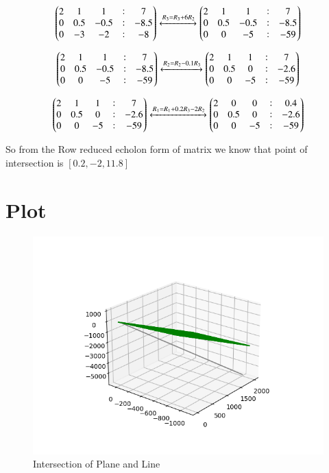\documentclass[journal,12pt,twocolumn]{IEEEtran}
\begin{document}
\begin{align}
\begin{pmatrix}2 & 1 & 1 & : & 7\\0 & 0.5 & -0.5 & : & -8.5\\ 0 & -3 & -2 & : & -8 \end{pmatrix}\xleftrightarrow{R_3=R_3+6R_2}\begin{pmatrix}2 & 1 & 1 & : & 7\\0 & 0.5 & -0.5 & : & -8.5\\ 0 & 0 & -5 & : & -59 \end{pmatrix}
\end{align}

\begin{align}
\begin{pmatrix}2 & 1 & 1 & : & 7\\0 & 0.5 & -0.5 & : & -8.5\\ 0 & 0 & -5 & : & -59 \end{pmatrix}\xleftrightarrow{R_2=R_2-0.1R_3}\begin{pmatrix}2 & 1 & 1 & : & 7\\0 & 0.5 & 0 & : & -2.6\\ 0 & 0 & -5 & : & -59 \end{pmatrix}
\end{align}

\begin{align}
\begin{pmatrix}2 & 1 & 1 & : & 7\\0 & 0.5 & 0 & : & -2.6\\ 0 & 0 & -5 & : & -59 \end{pmatrix}\xleftrightarrow{R_1=R_1+0.2R_3-2R_2}\begin{pmatrix}2&0&0&:&0.4\\0&0.5&0&:&-2.6\\ 0&0&-5&:&-59\end{pmatrix}
\end{align}    


So from the Row reduced echolon form of matrix we know that point of intersection is $[0.2,-2,11.8]$

\section{Plot}
\begin{figure}[!htbp]
    \centering
    \includegraphics[width =\columnwidth]{Figure_1.png}
    \caption{Intersection of Plane and Line }
    \label{fig:1}
\end{figure}
\end{document}
